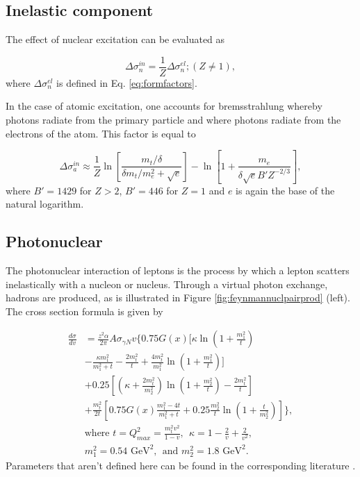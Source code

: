 \subsection{Inelastic component}

The effect of nuclear excitation can be evaluated as

\begin{equation}
\Delta \sigma^{in}_n = \frac{1}{Z} \Delta \sigma^{el}_n; (Z \neq 1),
 \end{equation}
where $\Delta \sigma^{el}_n$ is defined in Eq. \ref{eq:formfactors}.

In the case of atomic excitation, one accounts for bremsstrahlung whereby photons radiate from the primary particle and where photons radiate from the electrons of the atom. This factor is equal to

\begin{equation}
\Delta \sigma^{in}_a \approx \frac{1}{Z} \ln \left[ \frac{m_t/\delta}{\delta m_t/m_e^2 + \sqrt{e}} \right] - \ln\left[1+ \frac{m_e}{\delta \sqrt{e} B' Z^{-2/3}} \right],
\end{equation}
where $B'=1429$ for $Z > 2$, $B' = 446$ for $Z=1$ and $e$ is again the base of the natural logarithm.
\subsection{Photonuclear}
The photonuclear interaction of leptons is the process by which a lepton scatters inelastically with a nucleon or nucleus. Through a virtual photon exchange, hadrons are produced, as is illustrated in Figure \ref{fig:feynmannuclpairprod} (left). The cross section formula is given by

\begin{equation} 
\begin{split} 
\frac{d\sigma}{dv} &= \frac{z^2 \alpha}{2\pi} A \sigma_{\gamma N} v  \Bigg \lbrace  0.75 G(x) \Bigg [\kappa \ln \left(1+\frac{m_1^2}{t}\right) \\
& -\frac{\kappa m_1^2}{m_1^2 + t} - \frac{2 m_t^2}{t} + \frac{4 m_t^2}{m_1^2} \ln \left(1+ \frac{m_1^2}{t} \right)  \Bigg] \\
& + 0.25 \left[ \left(\kappa + \frac{2m_t^2}{m_2^2} \right) \ln \left(1+\frac{m_2^2}{t} \right) - \frac{2m_t^2}{t}\right]\\
& + \frac{m_t^2}{2t} \left[ 0.75 G(x) \frac{m_1^2 -4t}{m_1^2 +t} +0.25 \frac{m_2^2}{t} \ln \left(1+\frac{t}{m_2^2} \right) \right] \Bigg \rbrace,\\
& \textrm{where \ \ } t = Q_{max}^2 = \frac{m_t^2 v^2}{1-v}, \ \ \kappa = 1-\frac{2}{v} + \frac{2}{v^2}, \\
& m_1^2 = 0.54 \textrm{ GeV}^2, \ \ \textrm{and \ \ \ } m_2^2 = 1.8 \textrm{\ GeV}^2.
\end{split} 
\end{equation}
Parameters that aren't defined here can be found in the corresponding literature \cite{Chirkin:2004hz}.

